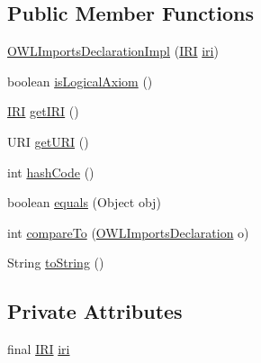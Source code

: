 \subsection*{Public Member Functions}
\begin{DoxyCompactItemize}
\item 
\hyperlink{classuk_1_1ac_1_1manchester_1_1cs_1_1owl_1_1owlapi_1_1_o_w_l_imports_declaration_impl_a00d1cf599013ec3c8bc9ea37de2277cc}{O\-W\-L\-Imports\-Declaration\-Impl} (\hyperlink{classorg_1_1semanticweb_1_1owlapi_1_1model_1_1_i_r_i}{I\-R\-I} \hyperlink{classuk_1_1ac_1_1manchester_1_1cs_1_1owl_1_1owlapi_1_1_o_w_l_imports_declaration_impl_abaca9152cc547e7988311b3d1f2dac9e}{iri})
\item 
boolean \hyperlink{classuk_1_1ac_1_1manchester_1_1cs_1_1owl_1_1owlapi_1_1_o_w_l_imports_declaration_impl_aa6d59b0f63995d1284ce1b3aec3a948a}{is\-Logical\-Axiom} ()
\item 
\hyperlink{classorg_1_1semanticweb_1_1owlapi_1_1model_1_1_i_r_i}{I\-R\-I} \hyperlink{classuk_1_1ac_1_1manchester_1_1cs_1_1owl_1_1owlapi_1_1_o_w_l_imports_declaration_impl_a3b1d0f06711ad9f34f6b71db89e5d688}{get\-I\-R\-I} ()
\item 
U\-R\-I \hyperlink{classuk_1_1ac_1_1manchester_1_1cs_1_1owl_1_1owlapi_1_1_o_w_l_imports_declaration_impl_adfa460915304b046ab829ed2b3696651}{get\-U\-R\-I} ()
\item 
int \hyperlink{classuk_1_1ac_1_1manchester_1_1cs_1_1owl_1_1owlapi_1_1_o_w_l_imports_declaration_impl_a685c7f570e472a0edf6e943596663d38}{hash\-Code} ()
\item 
boolean \hyperlink{classuk_1_1ac_1_1manchester_1_1cs_1_1owl_1_1owlapi_1_1_o_w_l_imports_declaration_impl_add1a5a0dc2f401ec2f52e627c6b44417}{equals} (Object obj)
\item 
int \hyperlink{classuk_1_1ac_1_1manchester_1_1cs_1_1owl_1_1owlapi_1_1_o_w_l_imports_declaration_impl_a01b65f43d1f01e82e8349ac547db90fd}{compare\-To} (\hyperlink{interfaceorg_1_1semanticweb_1_1owlapi_1_1model_1_1_o_w_l_imports_declaration}{O\-W\-L\-Imports\-Declaration} o)
\item 
String \hyperlink{classuk_1_1ac_1_1manchester_1_1cs_1_1owl_1_1owlapi_1_1_o_w_l_imports_declaration_impl_a543d457d4f89e06a91a9e03cb5153931}{to\-String} ()
\end{DoxyCompactItemize}
\subsection*{Private Attributes}
\begin{DoxyCompactItemize}
\item 
final \hyperlink{classorg_1_1semanticweb_1_1owlapi_1_1model_1_1_i_r_i}{I\-R\-I} \hyperlink{classuk_1_1ac_1_1manchester_1_1cs_1_1owl_1_1owlapi_1_1_o_w_l_imports_declaration_impl_abaca9152cc547e7988311b3d1f2dac9e}{iri}
\end{DoxyCompactItemize}
